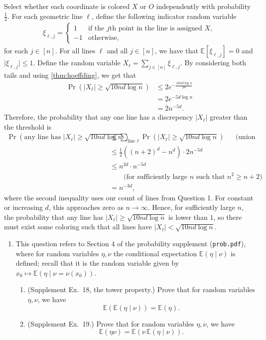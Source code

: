 \documentclass[11pt,letterpaper]{article}
\theoremstyle{definition}
\newcommand{\EE}{\mathbb{E}}
\begin{document}
Select whether each coordinate is colored $X$ or $O$ independently with probability $\frac{1}{2}$.
For each geometric line $\ell$, define the following indicator random variable
\begin{align*}
    \xi_{\ell,j} = \begin{cases}
        1 &\text{if the }j\text{th point in the line is assigned $X$}, \\
        -1 &\text{otherwise,}
    \end{cases}
\end{align*}
for each $j\in [n]$. For all lines $\ell$ and all $j\in[n]$, we have that $\EE[\xi_{\ell,j}]=0$ and $\lvert\xi_{\ell,j}\rvert \leq 1$. 
Define the random variable $X_\ell=\sum_{j\in[n]}\xi_{\ell,j}$. By considering both tails and using \cref{thm:hoeffding}, we get that 
\begin{align*}
    \Pr(|X_\ell|\geq \sqrt{10nd\log n})&\leq 2e^{-\frac{10nd\log n}{2n}} \\
    & = 2e^{-5d\log n} \\
    & = 2n^{-5d}.
\end{align*}
Therefore, the probability that any one line has a discrepency $\lvert X_\ell\rvert$ greater than the threshold is
\begin{align*}
    \Pr(\text{any line has }\lvert X_\ell\rvert\geq \sqrt{10nd\log n}) &\leq \sum_{\text{line }\ell}\Pr(|X_\ell|\geq \sqrt{10nd\log n}) && \text{(union bound)} \\
    &\leq \frac{1}{2}\left((n+2)^d-n^d\right)\cdot 2n^{-5d} \\
    &\leq n^{2d}\cdot n^{-5d}  \\
    &\qquad\text{(for sufficiently large $n$ such that $n^2\geq n+2$)}\\
    &= n^{-3d},
\end{align*}
where the second inequality uses our count of lines from Question 1. 
For constant or increasing $d$, this approaches zero as $n\to\infty$. 
Hence, for sufficiently large $n$, the probability that any line has $\lvert X_\ell\rvert\geq \sqrt{10nd\log n}$ is lower than $1$, so there must exist some coloring such that all lines have $\lvert X_\ell\rvert < \sqrt{10nd\log n}$.



\begin{enumerate}[resume]
\item This question refers to Section 4 of the probability supplement (\texttt{prob.pdf}), where for random variables $\eta,\nu$ the conditional expectation $\EE(\eta\mid\nu)$ is defined; recall that it is the random variable given by $x_0\mapsto\EE(\eta\mid\nu = \nu(x_0))$.
\begin{enumerate}
\item (Supplement Ex.~18, the tower property.) Prove that for random variables $\eta,\nu$, we have
\[
\EE(\EE(\eta\mid\nu)) = \EE(\eta).
\]
\item (Supplement Ex.~19.) Prove that for random variables $\eta,\nu$, we have
\[
\EE(\eta\nu) = \EE(\nu\,\EE(\eta\mid\nu)).
\]
\end{enumerate}
\end{enumerate}
\end{document}
